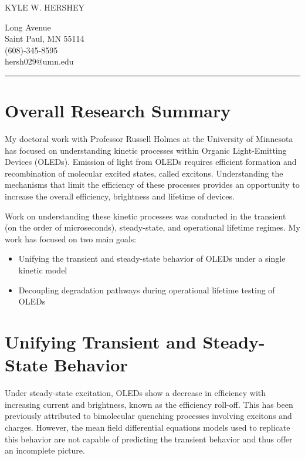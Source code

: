 \documentclass[a4paper,titlepage]{article}
\begin{document}
\Huge \noindent KYLE W. HERSHEY \hfill 
\footnotesize \parbox[b]{2in}{\begingroup {} Long Avenue\\Saint Paul, MN 55114\\(608)-345-8595\\hersh029@umn.edu \par \endgroup}
\normalsize
\vspace{1ex}
\hrule
\vspace{-2ex}

\section*{Overall Research Summary}
My doctoral work with Professor Russell Holmes at the University of Minnesota has focused on understanding kinetic processes within Organic Light-Emitting Devices (OLEDs).  Emission of light from OLEDs requires efficient formation and recombination of molecular excited states, called excitons.  Understanding the mechanisms that limit the efficiency of these processes provides an opportunity to increase the overall efficiency, brightness and lifetime of devices.

Work on understanding these kinetic processes was conducted in the transient  (on the order of microseconds), steady-state, and operational lifetime regimes.  My work has focused on two main goals:

\begin{itemize}
\item Unifying the transient and steady-state behavior of OLEDs under a single kinetic model
\item Decoupling degradation pathways during operational lifetime testing of OLEDs
\end{itemize}

\section*{Unifying Transient and Steady-State Behavior}

Under steady-state excitation, OLEDs show a decrease in efficiency with increasing current and brightness, known as the efficiency roll-off.  This has been previously attributed to bimolecular quenching processes involving excitons and charges.  However, the mean field differential equations models used to replicate this behavior are not capable of predicting the transient behavior and thus offer an incomplete picture.  
\end{document}
